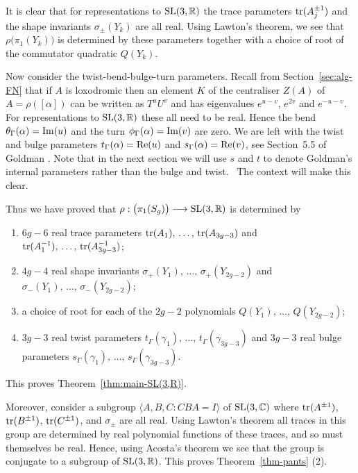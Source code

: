 \documentclass[11pt]{amsart}
\numberwithin{equation}{section}
\begin{document}
It is clear that for representations to ${\rm SL}(3,{\mathbb R})$ the trace parameters
${\rm tr}(A_j^{\pm 1})$ and the shape invariants $\sigma_\pm(Y_k)$ are all real. Using Lawton's theorem,
we see that $\rho\bigl(\pi_1(Y_k)\bigr)$ is determined by these parameters together with a choice of
root of the commutator quadratic $Q(Y_k)$. 

Now consider the twist-bend-bulge-turn parameters. Recall from Section~\ref{sec:alg-FN} that if $A$ is loxodromic
then an element $K$ of the centraliser $Z(A)$ of $A=\rho([\alpha])$ can be written as $T^uU^v$ and has eigenvalues 
$e^{u-v}$, $e^{2v}$ and $e^{-u-v}$. For representations to ${\rm SL}(3,{\mathbb R})$ these all need to be real.
Hence the bend $\theta_\Gamma(\alpha)={\rm Im}(u)$ and the turn $\phi_\Gamma(\alpha)={\rm Im}(v)$ are zero. 
We are left with the twist and bulge parameters
$t_\Gamma(\alpha)={\rm Re}(u)$ and $s_\Gamma(\alpha)={\rm Re}(v)$, see Section~5.5 of Goldman \cite{Gol}. 
Note that in the next section we will use $s$ and $t$ to denote Goldman's internal parameters rather than the bulge and twist. \
The context will make this clear.

Thus we have proved that $\rho:\bigl(\pi_1(S_g)\bigr)\longrightarrow {\rm SL}(3,{\mathbb R})$ is determined by
\begin{enumerate}
\item[(1)] $6g-6$ real trace parameters ${\rm tr}(A_1),\,\ldots,\,{\rm tr}(A_{3g-3})$ and 
${\rm tr}(A_1^{-1}),\,\ldots,\,{\rm tr}(A_{3g-3}^{-1})$;
\item[(2)] $4g-4$ real shape invariants $\sigma_+(Y_1),\,\ldots,\,\sigma_+(Y_{2g-2})$ and 
$\sigma_-(Y_1),\,\ldots,\,\sigma_-(Y_{2g-2})$;
\item[(3)] a choice of root for each of the $2g-2$ polynomials $Q(Y_1),\,\ldots,\, Q(Y_{2g-2})$;
\item[(4)] $3g-3$ real twist parameters $t_\Gamma(\gamma_1),\,\ldots,\, t_\Gamma(\gamma_{3g-3})$ and 
$3g-3$ real bulge parameters $s_\Gamma(\gamma_1),\,\ldots,\, s_\Gamma(\gamma_{3g-3})$.
\end{enumerate}
This proves Theorem~\ref{thm:main-SL(3,R)}. 

Moreover, consider a subgroup $\langle A,B,C:CBA=I\rangle$ of ${\rm SL}(3,{\mathbb C})$ where 
${\rm tr}(A^{\pm 1})$, ${\rm tr}(B^{\pm 1})$, ${\rm tr}(C^{\pm 1})$, and $\sigma_\pm$ are all real. 
Using Lawton's theorem all traces in this group are determined by real polynomial functions of these traces, and so 
must themselves be real. Hence, using Acosta's theorem we see that the group is conjugate to a subgroup
of ${\rm SL}(3,{\mathbb R})$. This proves Theorem~\ref{thm-pants} (2).
\end{document}
